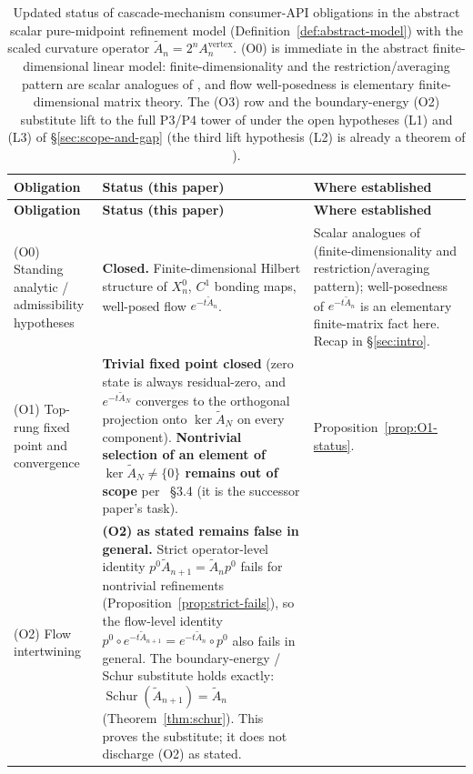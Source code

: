 \documentclass[11pt]{article}
\theoremstyle{plain}
\theoremstyle{definition}
\theoremstyle{remark}
\newcommand{\Schur}{\operatorname{Schur}}
\begin{document}
\begin{longtable}{>{\raggedright\arraybackslash}p{}>{\raggedright\arraybackslash}p{}>{\raggedright\arraybackslash}p{}}
\caption{Updated status of cascade-mechanism consumer-API obligations
in the abstract scalar pure-midpoint refinement model
(Definition~\ref{def:abstract-model}) with the scaled curvature
operator $\widetilde A_n = 2^n A_n^{\mathrm{vertex}}$. (O0) is
immediate in the abstract finite-dimensional linear model:
finite-dimensionality and the restriction/averaging pattern are
scalar analogues of \cite{CascadeRefinementSpaces}, and flow
well-posedness is elementary finite-dimensional matrix theory.
The (O3) row and the boundary-energy
(O2) substitute lift to the full P3/P4 tower of
\cite{CascadeRefinementSpaces, CascadeClosureDynamics} under the
open hypotheses \textup{(L1)} and \textup{(L3)} of
\S\ref{sec:scope-and-gap} (the third lift hypothesis \textup{(L2)}
is already a theorem of \cite{CascadeRefinementSpaces}).}\label{tab:status-update}\\
\toprule
\textbf{Obligation} & \textbf{Status (this paper)} & \textbf{Where established} \\
\midrule
\endfirsthead
\toprule
\textbf{Obligation} & \textbf{Status (this paper)} & \textbf{Where established} \\
\midrule
\endhead
(O0) Standing analytic / admissibility hypotheses
& \textbf{Closed.} Finite-dimensional Hilbert structure of $X_n^{0}$, $C^1$ bonding maps, well-posed flow $e^{-t \widetilde A_n}$.
& Scalar analogues of \cite{CascadeRefinementSpaces} (finite-dimensionality and restriction/averaging pattern); well-posedness of $e^{-t \widetilde A_n}$ is an elementary finite-matrix fact here. Recap in \S\ref{sec:intro}. \\
(O1) Top-rung fixed point and convergence
& \textbf{Trivial fixed point closed} (zero state is always residual-zero, and $e^{-t \widetilde A_N}$ converges to the orthogonal projection onto $\ker \widetilde A_N$ on every component). \textbf{Nontrivial selection of an element of $\ker \widetilde A_N \ne \{0\}$ remains out of scope} per \cite{CascadeMechanism}~\S3.4 (it is the successor paper's task).
& Proposition~\ref{prop:O1-status}. \\
(O2) Flow intertwining
& \textbf{(O2) as stated remains false in general.} Strict operator-level identity $p^{0} \widetilde A_{n+1} = \widetilde A_n p^{0}$ fails for nontrivial refinements (Proposition~\ref{prop:strict-fails}), so the flow-level identity $p^{0} \circ e^{-t \widetilde A_{n+1}} = e^{-t \widetilde A_n} \circ p^{0}$ also fails in general. The boundary-energy / Schur substitute holds exactly: $\Schur(\widetilde A_{n+1}) = \widetilde A_n$ (Theorem~\ref{thm:schur}). This proves the substitute; it does not discharge (O2) as stated.

\end{longtable}
\end{document}
